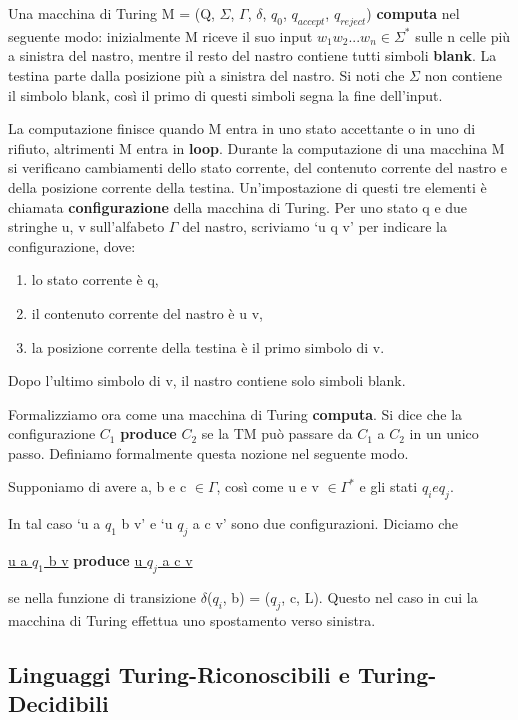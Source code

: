 \documentclass{article}
\begin{document}
Una macchina di Turing M = (Q, $\Sigma$, $\Gamma$, $\delta$, $q_0$,
$q_{accept}$, $q_{reject}$) \textbf{computa} nel seguente modo: inizialmente M
riceve il suo input $w_1w_2...w_n \in \Sigma^*$ sulle n celle più a sinistra del
nastro, mentre il resto del nastro contiene tutti simboli \textbf{blank}. La
testina parte dalla posizione più a sinistra del nastro. Si noti che $\Sigma$
non contiene il simbolo blank, così il primo di questi simboli segna la fine
dell'input.

La computazione finisce quando M entra in uno stato accettante o in uno di
rifiuto, altrimenti M entra in \textbf{loop}. Durante la computazione di una
macchina M si verificano cambiamenti dello stato corrente, del contenuto
corrente del nastro e della posizione corrente della testina. Un'impostazione di
questi tre elementi è chiamata \textbf{configurazione} della macchina di Turing.
Per uno stato q e due stringhe u, v sull'alfabeto $\Gamma$ del nastro, scriviamo
`u q v' per indicare la configurazione, dove:

\begin{enumerate}
    \item lo stato corrente è q,
    \item il contenuto corrente del nastro è u v,
    \item la posizione corrente della testina è il primo simbolo di v.
\end{enumerate}

Dopo l'ultimo simbolo di v, il nastro contiene solo simboli blank.

Formalizziamo ora come una macchina di Turing \textbf{computa}. Si dice che la
configurazione $C_1$ \textbf{produce} $C_2$ se la TM può passare da $C_1$ a
$C_2$ in un unico passo. Definiamo formalmente questa nozione nel seguente modo.

Supponiamo di avere a, b e c $\in \Gamma$, così come u e v $\in \Gamma^*$ e gli
stati $q_i e q_j$.

In tal caso `u a $q_1$ b v' e `u $q_j$ a c v' sono due configurazioni. Diciamo
che

\begin{center}
    \underline{u a $q_1$ b v} \textbf{produce} \underline{u $q_j$ a c v}
\end{center}

se nella funzione di transizione $\delta$($q_i$, b) = ($q_j$, c, L). Questo nel
caso in cui la macchina di Turing effettua uno spostamento verso sinistra.

\subsection{Linguaggi Turing-Riconoscibili e Turing-Decidibili}
\end{document}
